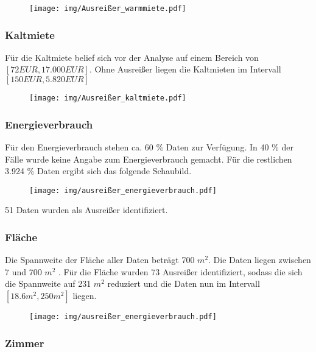 \begin{figure}[h!]
	\centering
	\texttt{[image: img/Ausreißer\_warmmiete.pdf]}
	\caption{}
	\label{fig: Ausreißer_vgl_warmmiete}
\end{figure}


\subsubsection{Kaltmiete}
Für die Kaltmiete belief sich vor der Analyse auf einem Bereich von $[ 72 EUR ,  17.000 EUR]$. Ohne Ausreißer liegen die Kaltmieten im Intervall $[150 EUR, 5.820 EUR]$
\begin{figure}[h!]
	\centering
	\texttt{[image: img/Ausreißer\_kaltmiete.pdf]}
	\caption{}
	\label{fig: Ausreißer_kaltmiete}
\end{figure}

\subsubsection{Energieverbrauch}

Für den Energieverbrauch stehen ca. 60 \% Daten zur Verfügung. In 40 \% der Fälle wurde keine Angabe zum Energieverbrauch gemacht. Für die restlichen 3.924 \% Daten ergibt sich das folgende Schaubild.

\begin{figure}[!h!]
	\centering
	\texttt{[image: img/ausreißer\_energieverbrauch.pdf]}
	\caption{}
	\label{fig: Ausreißer_kaltmiete}
\end{figure}

51 Daten wurden als Ausreißer identifiziert.

\subsubsection{Fläche}
Die Spannweite der Fläche aller Daten beträgt 700 $m^2$. Die Daten liegen zwischen 7 und 700 $m^2$ . Für die Fläche wurden 73 Ausreißer identifiziert, sodass die sich die Spannweite auf 231 $m^2$ reduziert und die Daten nun im Intervall $[18.6 m^2 , 250 m^2 ]$ liegen.

\begin{figure}[h!!]
	\centering
	\texttt{[image: img/ausreißer\_energieverbrauch.pdf]}
	\caption{}
	\label{fig: Ausreißer_flaeche}
\end{figure}

\subsubsection{Zimmer}


